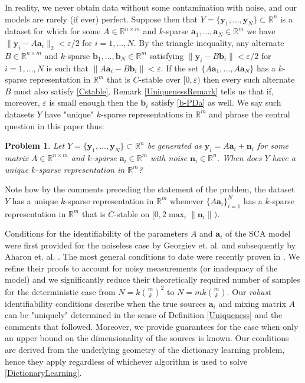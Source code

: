 \documentclass[journal, onecolumn]{IEEEtran}
\newtheorem{problem}{Problem}
\begin{document}
In reality, we never obtain data without some contamination with noise, and our models are rarely (if ever) perfect. Suppose then that $Y = \{\mathbf{y}_1, \ldots, \mathbf{y}_N\} \subset \mathbb{R}^n$ is a dataset for which for some $A \in \mathbb{R}^{n \times m}$ and $k$-sparse $\mathbf{a}_1, \ldots, \mathbf{a}_N \in \mathbb{R}^m$ we have $\|\mathbf{y}_i - A\mathbf{a}_i\|_2 < \varepsilon/2$ for $i = 1, \ldots, N$. By the triangle inequality, any alternate $B \in \mathbb{R}^{n \times m}$ and $k$-sparse $\mathbf{b}_1, \ldots, \mathbf{b}_N \in \mathbb{R}^m$ satisfying $\|\mathbf{y}_i - B\mathbf{b}_i\| < \varepsilon/2$ for $i = 1, \ldots, N$ is such that $\|A\mathbf{a}_i - B\mathbf{b}_i\| < \varepsilon$. If the set $\{A\mathbf{a}_1, \ldots, A\mathbf{a}_N\}$ has a $k$-sparse representation in $\mathbb{R}^m$ that is $C$-stable over $[0, \varepsilon)$ then every such alternate $B$ must also satisfy \eqref{Cstable}. Remark \ref{UniquenessRemark} tells us that if, moreover, $\varepsilon$ is small enough then the $\mathbf{b}_i$ satisfy \eqref{b-PDa} as well. We say such datasets $Y$ have "unique" $k$-sparse representations in $\mathbb{R}^m$ and phrase the central question in this paper thus:

\begin{problem}\label{DUTproblem}
Let $Y = \{\mathbf{y}_1, \ldots, \mathbf{y}_N \} \subset \mathbb{R}^n$ be generated as $\mathbf{y}_i = A\mathbf{a}_i  + \mathbf{n}_i$ for some matrix $A \in \mathbb{R}^{n \times m}$ and $k$-sparse $\mathbf{a}_i \in \mathbb{R}^m$ with noise $\mathbf{n}_i \in \mathbb{R}^n$. When does $Y$ have a unique $k$-sparse representation in $\mathbb{R}^m$?
\end{problem}

Note how by the comments preceding the statement of the problem, the dataset $Y$ has a unique $k$-sparse representation in $\mathbb{R}^m$ whenever $\{A\mathbf{a}_i\}_{i=1}^N$ has a $k$-sparse representation in $\mathbb{R}^m$ that is $C$-stable on $[0, 2\max_i \|\mathbf{n}_i\|)$.

Conditions for the identifiability of the parameters $A$ and $\mathbf{a}_i$ of the SCA model were first provided for the noiseless case by Georgiev et. al. \cite{Georgiev05} and subsequently by Aharon et. al. \cite{Aharon06}. The most general conditions to date were recently proven in \cite{HS11}. We refine their proofs to account for noisy measurements (or inadequacy of the model) and we significantly reduce their theoretically required number of samples for the deterministic case from $N=k{m \choose k}^2$ to $N = mk{m \choose k}$. Our \emph{robust} identifiability conditions describe when the true sources $\mathbf{a}_i$ and mixing matrix $A$ can be "uniquely" determined in the sense of Definition \ref{Uniqueness} and the comments that followed. Moreover, we provide guarantees for the case when only an upper bound on the dimensionality of the sources is known. Our conditions are derived from the underlying geometry of the dictionary learning problem, hence they apply regardless of whichever algorithm is used to solve \eqref{DictionaryLearning}. 
\end{document}
